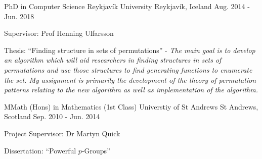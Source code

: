 


\begin{cventries}


  \cventry
  {PhD in Computer Science} %
  {Reykjavík University} %
  {Reykjavík, Iceland} %
  {Aug. 2014 - Jun. 2018} %
  {
    \begin{cvitems} %
      \item {
      Supervisor: Prof Henning Ulfarsson
      }
      \item {
      Thesis: ``Finding structure in sets of permutations'' -
      \textit{The main goal is to develop an algorithm which will aid
      researchers in finding structures in sets of permutations and use those
      structures to find generating functions to enumerate the set. My
      assignment is primarily the development of the theory of permutation
      patterns relating to the new algorithm as well as implementation of the
      algorithm.}
      }
    \end{cvitems}
  }


  \cventry
    {MMath (Hons) in Mathematics (1st Class)} %
    {Universtiy of St Andrews} %
    {St Andrews, Scotland} %
    {Sep. 2010 - Jun. 2014} %
    {
      \begin{cvitems} %
        \item {
        Project Supervisor: Dr Martyn Quick
        }
        \item {
        Dissertation: ``Powerful $p$-Groups'' }
      \end{cvitems}
    }

\end{cventries}
